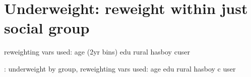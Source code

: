 \documentclass{article}
\begin{document}












\newpage 
\section{Underweight: reweight within \textbf{just social group} }

reweighting vars used: age (2yr bins) edu rural hasboy cuser

\begin{table}[H]
    \centering
    \footnotesize %
    \caption{: underweight by group, reweighting vars used: age edu rural hasboy c user}
    \label{tab:sumstat}
\end{table}
\end{document}
